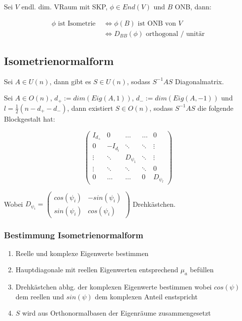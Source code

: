 Sei $V$ endl. dim. VRaum mit SKP, $\phi \in End(V)$ und $B$ ONB, dann:

\vspace*{-5mm}
\begin{align*}
	\phi \text{ ist Isometrie } &\Leftrightarrow \phi(B) \text{ ist ONB von } V \\
							    &\Leftrightarrow D_{BB}(\phi) \text{ orthogonal / unitär}
\end{align*}

\subsection*{Isometrienormalform}

Sei $A \in U(n)$, dann gibt es $S \in U(n)$, sodass $S^{-1} A S$ Diagonalmatrix.

Sei $A \in O(n)$, $d_+ := dim(Eig(A,1))$, $d_- := dim(Eig(A, -1))$ und $l = \frac{1}{2}(n - d_+ - d_-)$, dann existiert $S \in O(n)$, sodass $S^{-1} A S$ die folgende Blockgestalt hat:

$$\begin{pmatrix}
I_{d_+} & 0        & \hdots     & \hdots & 0      \\
0       & -I_{d_i} & \ddots     & \ddots & \vdots \\
\vdots  & \ddots   & D_{\psi_1} & \ddots & \vdots \\
\vdots  & \ddots   & \ddots     & \ddots & 0      \\
0       & \hdots   & \hdots     & 0      & D_{\psi_l}
\end{pmatrix}$$

Wobei $D_{\psi_i} = \begin{pmatrix} cos(\psi_i) & -sin(\psi_i) \\ sin(\psi_i) & cos(\psi_i) \end{pmatrix}$ Drehkästchen.

\subsubsection*{Bestimmung Isometrienormalform}

\begin{enumerate}[leftmargin=4mm]
	\item Reelle und komplexe Eigenwerte bestimmen
	\item Hauptdiagonale mit reellen Eigenwerten entsprechend $\mu_a$ befüllen
	\item Drehkästchen abhg. der komplexen Eigenwerte bestimmen wobei $cos(\psi)$ dem reellen und $sin(\psi)$ dem komplexen Anteil enstspricht
	\item $S$ wird aus Orthonormalbasen der Eigenräume zusammengesetzt
\end{enumerate}


